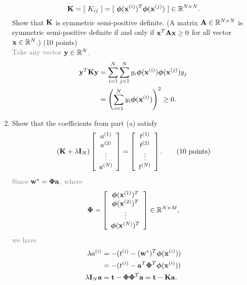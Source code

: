 \documentclass[12pt,a4paper]{article}
\newcommand{\gray}[1]{\textcolor{gray}{#1}}
\renewcommand{\v}[1]{\ifmmode\mathbf{#1}\fi}
\renewcommand{\l}{\left}
\renewcommand{\r}{\right}
\newcommand{\SUM}[2]{\sum\limits_{#1}^{#2}}
\newcommand{\x}{\times}
\def\R{\ifmmode\mathbb R\fi}
\newcommand{\solution}[1]{\gray{#1}}
\begin{document}
\begin{enumerate}[label=(\alph*)]
\begin{equation*}
\v K = [\ K_{ij}\ ] = [\ \boldsymbol\phi(\v x^{(i)})^T \boldsymbol\phi(\v x^{(j)}) \ ] \in \R^{N \x N}.
\end{equation*}
Show that $\v K$ is symmetric semi-positive definite. (A matrix $\v A \in \R^{N\x N}$ is symmetric semi-positive definite if and only if $\v x^T \v A \v x \geq 0$ for all vector $\v x \in \R^N$.) (10 points) 
\solution{\\
Take any vector $\v y \in \R^N$, 
\begin{align*}
\mathbf y^T \v K \v y &= \SUM{i=1}N\SUM{j=1}N y_i \boldsymbol\phi(\v x^{(i)})\boldsymbol\phi(\v x^{(j)}) y_j \\
&= \l(\SUM{i=1}N y_i \boldsymbol\phi(\v x^{(i)}) \r)^2 \geq 0.
\end{align*}
}
%
\item Show that the coefficients from part (a) satisfy
\begin{equation*}
(\v K + \lambda \v I_N) \l[
\begin{array}{c}
a^{(1)} \\
a^{(2)} \\
\vdots \\
a^{(N)}
\end{array}
\r] =  
\l[
\begin{array}{c}
t^{(1)} \\
t^{(2)} \\
\vdots \\
t^{(N)}
\end{array}
\r]. \hskip20pt \text{(10 points)}
\end{equation*}
\solution{
Since $\v w^\ast = \boldsymbol\Phi \v a$, where 
\begin{equation*}
\boldsymbol\Phi = \l[\begin{array}{c}
\boldsymbol\phi(\v x^{(1)})^T \\
\boldsymbol\phi(\v x^{(2)})^T \\
\vdots \\
\boldsymbol\phi(\v x^{(N)})^T
\end{array}
\r] \in \R^{N \x M},
\end{equation*}
we have
\begin{align*}
\lambda a^{(i)} & = - (t^{(i)} - (\v w^\ast)^T \boldsymbol\phi(\v x^{(i)})) \\
& = -(t^{(i)} - \v a^T \boldsymbol\Phi^T \boldsymbol\phi(\v x^{(i)})) \\
\lambda \v I_N \v a & = \v t - \boldsymbol\Phi \boldsymbol\Phi^T \v a = \v t - \v K \v a.
\end{align*}
}
\end{enumerate}
\end{document}

